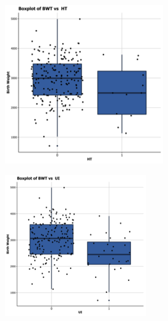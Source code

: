 \begin{figure}[!htb]
        \hfill
        \medskip
        
        \begin{subfigure}[b]{0.3\textwidth}   
            \centering 
            \includegraphics[width=\linewidth]{Images/BWTvsHT.png}
            \label{fig:BWTvsHT}
        \end{subfigure}
        \quad
        \begin{subfigure}[b]{0.3\textwidth}   
            \centering 
            \includegraphics[width=\linewidth]{Images/BWTvsUI.png}

\end{subfigure}
\end{figure}
